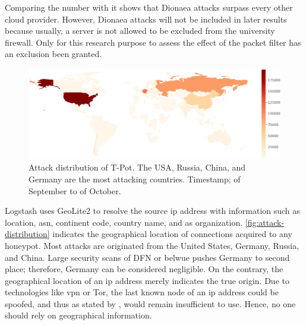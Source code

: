 Comparing the number with \citet{Kelly2021} it shows that Dionaea attacks surpass every other cloud provider.
However, Dionaea attacks will not be included in later results because usually, a server is not allowed to be excluded from the university firewall.
Only for this research purpose to assess the effect of the packet filter has an exclusion been granted.

\begin{figure}[htbp]
    \centering
    \includegraphics[width=\textwidth]{figures/tpot-overview-map.pdf}
    \caption[Attack distribution of T-Pot]{
        Attack distribution of T-Pot.
        The USA, Russia, China, and Germany are the most attacking countries.
        Timestamp;  of September to  of October.
    }
    \label{fig:attack-distribution}
\end{figure}

Logstash uses GeoLite2 to resolve the source \ac{ip} address with information such as location, \ac{asn}, continent code, country name, and \ac{as} organization.
\autoref{fig:attack-distribution} indicates the geographical location of connections acquired to any honeypot.
Most attacks are originated from the United States, Germany, Russia, and China.
Large security scans of DFN or \ac{belwue} pushes Germany to second place; therefore, Germany can be considered negligible.
On the contrary, the geographical location of an \ac{ip} address merely indicates the true origin.
Due to technologies like \ac{vpn} or Tor, the last known node of an \ac{ip} address could be spoofed, and thus as stated by \citet{Kelly2021}, would remain insufficient to use.
Hence, no one should rely on geographical information.

